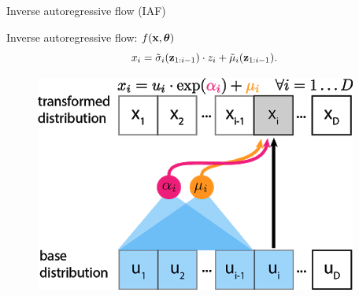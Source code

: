 \begin{frame}{Inverse autoregressive flow (IAF)}
	\begin{minipage}[t]{0.65\columnwidth}
		\begin{block}{Inverse autoregressive flow: $f(\mathbf{x}, \boldsymbol{\theta})$}
			\[
			x_i = \tilde{\sigma}_i (\mathbf{z}_{1:i-1}) \cdot z_i + \tilde{\mu}_i(\mathbf{z}_{1:i-1}).
			\]
		\end{block}
	\end{minipage}%
	\begin{minipage}[t]{0.35\columnwidth}
		\begin{figure}[h]
			\centering
			\includegraphics[width=.9\linewidth]{figs/maf_iaf_explained_3.png}
		\end{figure}
	\end{minipage}
	
\end{frame}
